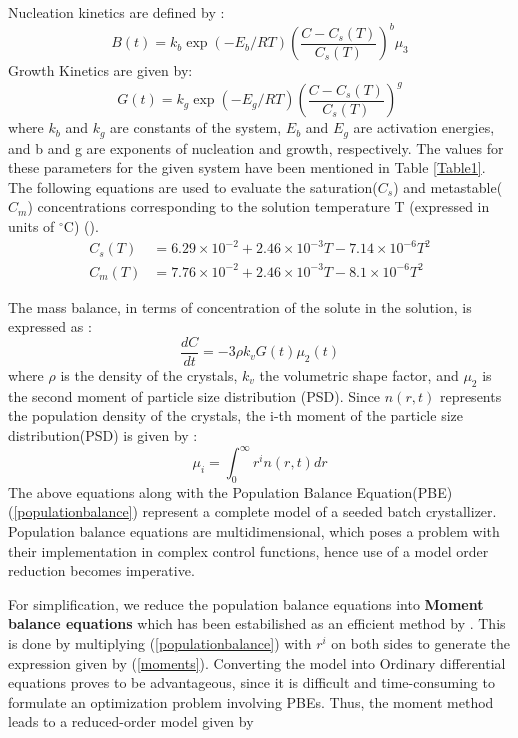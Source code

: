 \documentclass[3p,times,authoryear]{elsarticle}
\begin{document}
Nucleation kinetics are defined by :
\begin{equation}
B(t) = k_{b}\exp{\left(-E_{b}/RT \right)}\left(\frac{C - C_{s}(T)}{C_{s}(T)}\right)^{b}\mu_{3} \label{nucleation}
\end{equation}  
Growth Kinetics are given by:
\begin{equation}
G(t) = k_{g}\exp{\left(-E_{g}/RT \right)}\left(\frac{C - C_{s}(T)}{C_{s}(T)}\right)^{g} \label{growth}
\end{equation}
where $k_{b}$ and $k_{g}$ are constants of the system, $E_{b}$ and $E_{g}$ are activation energies, and b and g are exponents of nucleation and growth, respectively. The values for these parameters for the given system have been mentioned in Table \ref{Table1}. The following equations are used to evaluate the saturation($C_{s}$) and metastable($C_{m}$) concentrations corresponding to the solution temperature T (expressed in units of $^\circ$C) (\cite{shi}). \\
\begin{align}
C_{s}(T) &= 6.29\times10^{-2} + 2.46\times10^{-3}T - 7.14\times10^{-6}T^{2} \label{sat}\\
C_{m}(T) &= 7.76\times10^{-2} + 2.46\times10^{-3}T - 8.1\times10^{-6}T^{2} \label{meta}
\end{align}

 
The mass balance, in terms of concentration of the solute in the solution, is expressed as :
\begin{equation}
\frac{dC}{dt} = -3\rho{}k_{v}G(t)\mu_{2}(t)
\end{equation}
where $\rho{}$ is the density of the crystals, $k_{v}$ the volumetric shape factor, and $\mu_{2}$ is the second moment of particle size distribution (PSD).
Since $n(r,t)$ represents the population density of the crystals, the i-th moment of the particle size distribution(PSD) is given by :
\begin{equation} \label{moments}
\mu_{i} = \int_{0}^{\infty} r^{i}n(r,t) dr
\end{equation}
The above equations along with the Population Balance Equation(PBE) (\ref{populationbalance}) represent a complete model of a seeded batch crystallizer. 
Population balance equations are multidimensional, which poses a problem with their implementation in complex control functions, hence use of a model order reduction becomes imperative.\par
For simplification, we reduce the population balance equations into \textbf{Moment balance equations} which has been estabilished as an efficient method by \cite{yenkie}. This is done by multiplying (\ref{populationbalance}) with $r^{i}$ on both sides to generate the expression given by (\ref{moments}). Converting the model into Ordinary differential equations proves to be advantageous, since it is difficult and time-consuming to formulate an optimization problem involving PBEs. Thus, the moment method leads to a reduced-order model given by 
\end{document}
